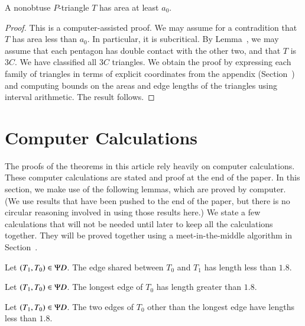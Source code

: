 \begin{lemma}  
A nonobtuse $P$-triangle $T$ has area at least $a_0$.
\end{lemma}

\begin{proof} This is a computer-assisted proof.  We may assume for a
  contradition that $T$ has area less than $a_0$.  In particular, it
  is subcritical.  By Lemma~, we may assume that each
  pentagon has double contact with the other two, and that $T$ is
  $3C$.  We have classified all $3C$ triangles.  We obtain the proof
by expressing each family of triangles in terms of explicit
coordinates from the appendix (Section~) and
computing bounds on the areas and edge lengths of the triangles using
interval arithmetic.  The result follows.
\end{proof}

\section{Computer Calculations}

The proofs of the theorems in this article rely heavily on computer calculations.
These computer calculations are stated and proof at the end of the paper.
In this section, we make use of the following lemmas, which are proved by
computer.  (We use results that have been pushed to the end of the paper, but
there is no circular reasoning involved in using those results here.)  We state
a few calculations that will not be needed until later to keep all  the calculations
together.  They will be proved together using a meet-in-the-middle algorithm in
Section~.

\begin{lemma}  
Let $(T_1,T_0)\in \Psi D$.  The edge shared between
$T_0$ and $T_1$ has length less than $1.8$. 
\end{lemma}

\begin{lemma} 
Let $(T_1,T_0)\in \Psi D$.  The longest edge of $T_0$
has length greater than $1.8$.
\end{lemma}

\begin{lemma}  
Let $(T_1,T_0)\in \Psi D$.  The two edges of $T_0$ other than the longest edge have lengths less
than $1.8$.
\end{lemma}


